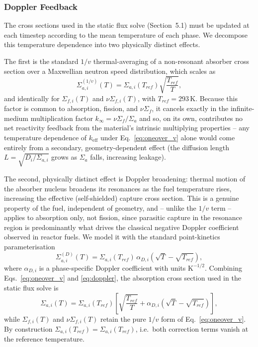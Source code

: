 \documentclass[12pt]{article}
\begin{document}
\subsubsection{Doppler Feedback}

The cross sections used in the static flux solve (Section~5.1) must be
updated at each timestep according to the mean temperature of each
phase. We decompose this temperature dependence into two physically
distinct effects.

The first is the standard $1/v$ thermal-averaging of a
non-resonant absorber cross section over a Maxwellian neutron speed
distribution, which scales as
\begin{equation}
    \Sigma_{a,i}^{(1/v)}(T) = \Sigma_{a,i}(T_{ref})
        \sqrt{\frac{T_{ref}}{T}},
    \label{eq:oneover_v}
\end{equation}
and identically for $\Sigma_{f,i}(T)$ and $\nu\Sigma_{f,i}(T)$, with
$T_{ref} = 293\,\mathrm{K}$. Because this factor is common to
absorption, fission, and $\nu\Sigma_f$, it cancels exactly in the
infinite-medium multiplication factor $k_\infty = \nu\Sigma_f/\Sigma_a$
and so, on its own, contributes no net reactivity feedback from the
material's intrinsic multiplying properties -- any temperature
dependence of $k_\mathrm{eff}$ under Eq.~\eqref{eq:oneover_v} alone
would come entirely from a secondary, geometry-dependent effect (the
diffusion length $L = \sqrt{D_i/\Sigma_{a,i}}$ grows as $\Sigma_a$
falls, increasing leakage).

The second, physically distinct effect is Doppler broadening: thermal
motion of the absorber nucleus broadens its resonances as the fuel
temperature rises, increasing the effective (self-shielded) capture
cross section. This is a genuine property of the fuel, independent of
geometry, and -- unlike the $1/v$ term -- applies to absorption only,
not fission, since parasitic capture in the resonance region is
predominantly what drives the classical negative Doppler coefficient
observed in reactor fuels. We model it with the standard
point-kinetics parameterisation
\begin{equation}
    \Sigma_{a,i}^{(D)}(T) = \Sigma_{a,i}(T_{ref})\,
        \alpha_{D,i}\left(\sqrt{T} - \sqrt{T_{ref}}\right),
    \label{eq:doppler}
\end{equation}
where $\alpha_{D,i}$ is a phase-specific Doppler coefficient with
units $\mathrm{K}^{-1/2}$. Combining Eqs.~\eqref{eq:oneover_v} and
\eqref{eq:doppler}, the absorption cross section used in the static
flux solve is
\begin{equation}
    \Sigma_{a,i}(T) = \Sigma_{a,i}(T_{ref})
        \left[\sqrt{\frac{T_{ref}}{T}}
            + \alpha_{D,i}\left(\sqrt{T} - \sqrt{T_{ref}}\right)
        \right],
    \label{eq:sigma_a_full}
\end{equation}
while $\Sigma_{f,i}(T)$ and $\nu\Sigma_{f,i}(T)$ retain the pure
$1/v$ form of Eq.~\eqref{eq:oneover_v}. By construction
$\Sigma_{a,i}(T_{ref}) = \Sigma_{a,i}(T_{ref})$, i.e.\ both correction
terms vanish at the reference temperature.
\end{document}
